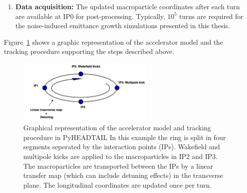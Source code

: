 {\begin{enumerate}
    
    The wake functions are available from the detailed imepdance model of the machine, which are obtained from a combination of theoretical computations and electromagnetic simulations and can be imported in PyHEADTAIL in form of tables~\cite{pyheadtail_manual_adrian}. Typically, the impedance model of an accelerator is provided normalised with the average value of the horizontal and vertical beta functions over the machine at the respective plane. Therefore the transverse beta functions at the location where the wakefield kicks are applied on the beam must equal these average values.%
    
    \item \textbf{Data acquisition:} The updated macroparticle coordinates after each turn are available at IP0 for post-processing. Typically, $10^{5}$ turns are required for the noise-induced emittance growth simulations presented in this thesis. 
    
\end{enumerate}


Figure~\ref{fig:pyheadtail_accelerator_model} shows a graphic representation of the accelerator model and the tracking procedure supporting the steps described above.

\begin{figure}[!h]
    \centering         
    \includegraphics[width=0.6\textwidth]{images/Ch2/accelerator_model_graph_pyheadtail.png}
        \caption{Graphical representation of the accelerator model and tracking procedure in PyHEADTAIL %
        In this example the ring is split in four segments seperated by the interaction points (IPs). Wakefield and multipole kicks are applied to the macroparticles in IP2 and IP3. The macroparticles are transported between the IPs by a linear transfer map (which can include detuning effects) in the transverse plane.  The longitudinal coordinates are updated once per turn.}
        \label{fig:pyheadtail_accelerator_model}
 \end{figure}


}
